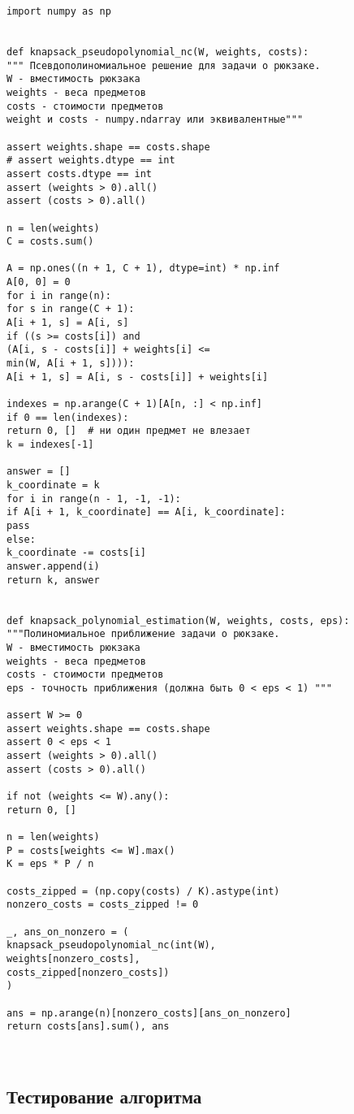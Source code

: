 \documentclass{article}
\begin{document}
\begin{verbatim}
import numpy as np


def knapsack_pseudopolynomial_nc(W, weights, costs):
""" Псевдополиномиальное решение для задачи о рюкзаке.
W - вместимость рюкзака
weights - веса предметов
costs - стоимости предметов
weight и costs - numpy.ndarray или эквивалентные"""

assert weights.shape == costs.shape
# assert weights.dtype == int
assert costs.dtype == int
assert (weights > 0).all()
assert (costs > 0).all()

n = len(weights)
C = costs.sum()

A = np.ones((n + 1, C + 1), dtype=int) * np.inf
A[0, 0] = 0
for i in range(n):
for s in range(C + 1):
A[i + 1, s] = A[i, s]
if ((s >= costs[i]) and
(A[i, s - costs[i]] + weights[i] <=
min(W, A[i + 1, s]))):
A[i + 1, s] = A[i, s - costs[i]] + weights[i]

indexes = np.arange(C + 1)[A[n, :] < np.inf]
if 0 == len(indexes):
return 0, []  # ни один предмет не влезает
k = indexes[-1]

answer = []
k_coordinate = k
for i in range(n - 1, -1, -1):
if A[i + 1, k_coordinate] == A[i, k_coordinate]:
pass
else:
k_coordinate -= costs[i]
answer.append(i)
return k, answer


def knapsack_polynomial_estimation(W, weights, costs, eps):
"""Полиномиальное приближение задачи о рюкзаке.
W - вместимость рюкзака
weights - веса предметов
costs - стоимости предметов
eps - точность приближения (должна быть 0 < eps < 1) """

assert W >= 0
assert weights.shape == costs.shape
assert 0 < eps < 1
assert (weights > 0).all()
assert (costs > 0).all()

if not (weights <= W).any():
return 0, []

n = len(weights)
P = costs[weights <= W].max()
K = eps * P / n

costs_zipped = (np.copy(costs) / K).astype(int)
nonzero_costs = costs_zipped != 0

_, ans_on_nonzero = (
knapsack_pseudopolynomial_nc(int(W),
weights[nonzero_costs],
costs_zipped[nonzero_costs])
)

ans = np.arange(n)[nonzero_costs][ans_on_nonzero]
return costs[ans].sum(), ans



\end{verbatim}
\subsection{Тестирование алгоритма}
\end{document}
